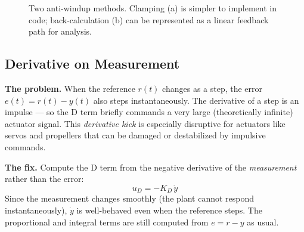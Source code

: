 \documentclass[12pt]{article}
\begin{document}
\begin{figure}[htbp]

\caption{Two anti-windup methods.  Clamping (a) is simpler to implement in
  code; back-calculation (b) can be represented as a linear feedback path
  for analysis.}
\label{fig:antiwindup_both}
\end{figure}

\subsection{Derivative on Measurement}

\textbf{The problem.}
When the reference $r(t)$ changes as a step, the error
$e(t) = r(t) - y(t)$ also steps instantaneously.  The derivative of a step
is an impulse --- so the D term briefly commands a very large (theoretically
infinite) actuator signal.  This \emph{derivative kick} is especially
disruptive for actuators like servos and propellers that can be damaged or
destabilized by impulsive commands.

\textbf{The fix.}
Compute the D term from the negative derivative of the \emph{measurement}
rather than the error:
\[
  u_D = -K_D\,\dot{y}
\]
Since the measurement changes smoothly (the plant cannot respond
instantaneously), $\dot{y}$ is well-behaved even when the reference steps.
The proportional and integral terms are still computed from $e = r - y$ as
usual.
\end{document}
